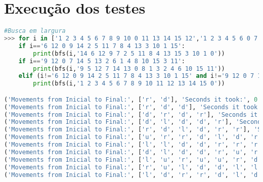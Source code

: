 \documentclass{article}
\begin{document}
\section{Execução dos testes}
\begin{lstlisting}[language = Python]
#Busca em largura
>>> for i in ['1 2 3 4 5 6 7 8 9 10 0 11 13 14 15 12','1 2 3 4 5 6 0 7 9 10 11 8 13 14 15 12','1 2 3 4 5 0 7 8 9 6 10 12 13 14 11 15','1 2 3 0 5 6 8 4 9 10 7 12 13 14 11 15','1 2 3 4 5 0 6 8 9 11 7 12 13 10 14 15','1 2 3 4 5 10 6 7 9 0 12 8 13 14 11 15','6 12 0 9 14 2 5 11 7 8 4 13 3 10 1 15','1 0 3 4 6 2 7 8 5 14 10 12 9 13 11 15','1 6 2 4 5 10 3 8 13 9 7 11 14 0 15 12','1 2 3 4 5 6 8 12 13 9 0 7 14 11 10 15','9 12 0 7 14 5 13 2 6 1 4 8 10 15 3 11']:
	if i=='6 12 0 9 14 2 5 11 7 8 4 13 3 10 1 15':
		print(bfs(i,'14 6 12 9 7 2 5 11 8 4 13 15 3 10 1 0'))
	if i=='9 12 0 7 14 5 13 2 6 1 4 8 10 15 3 11':
		print(bfs(i,'9 5 12 7 14 13 0 8 1 3 2 4 6 10 15 11'))
	elif (i!='6 12 0 9 14 2 5 11 7 8 4 13 3 10 1 15' and i!='9 12 0 7 14 5 13 2 6 1 4 8 10 15 3 11'):
		print(bfs(i,'1 2 3 4 5 6 7 8 9 10 11 12 13 14 15 0'))

('Movements from Inicial to Final:', ['r', 'd'], 'Seconds it took:', 0.00099945068359375, 'Space used:', 9)
('Movements from Inicial to Final:', ['r', 'd', 'd'], 'Seconds it took:', 0.0020008087158203125, 'Space used:', 24)
('Movements from Inicial to Final:', ['d', 'r', 'd', 'r'], 'Seconds it took:', 0.003998994827270508, 'Space used:', 61)
('Movements from Inicial to Final:', ['d', 'l', 'd', 'd', 'r'], 'Seconds it took:', 0.0039899349212646484, 'Space used:', 82)
('Movements from Inicial to Final:', ['r', 'd', 'l', 'd', 'r', 'r'], 'Seconds it took:', 0.020986080169677734, 'Space used:', 207)
('Movements from Inicial to Final:', ['u', 'r', 'r', 'd', 'l', 'd', 'r'], 'Seconds it took:', 0.06495904922485352, 'Space used:', 628)
('Movements from Inicial to Final:', ['l', 'l', 'd', 'd', 'r', 'r', 'r', 'd'], 'Seconds it took:', 0.16189789772033691, 'Space used:', 576)
('Movements from Inicial to Final:', ['d', 'l', 'd', 'd', 'r', 'u', 'r', 'd', 'r'], 'Seconds it took:', 0.4917006492614746, 'Space used:', 1862)
('Movements from Inicial to Final:', ['l', 'u', 'r', 'u', 'u', 'r', 'd', 'd', 'r', 'd'], 'Seconds it took:', 1.9309442043304443, 'Space used:', 2719)
('Movements from Inicial to Final:', ['r', 'u', 'l', 'd', 'd', 'l', 'l', 'u', 'r', 'r', 'd', 'r'], 'Seconds it took:', 55.61377549171448, 'Space used:', 19474)
('Movements from Inicial to Final:', ['l', 'd', 'r', 'r', 'd', 'l', 'd', 'l', 'l', 'u', 'r', 'r', 'u'], 'Seconds it took:', 151.5786578655243, 'Space used:', 24950)



\end{lstlisting}
\end{document}
